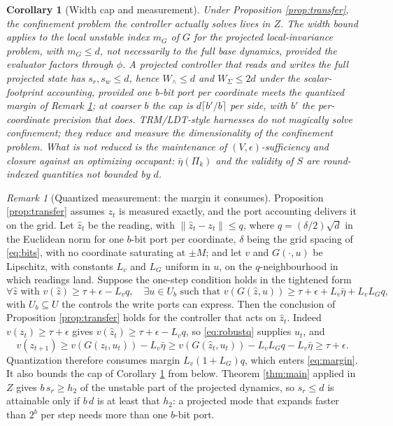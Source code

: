 \documentclass[11pt]{article}
\newtheorem{corollary}{Corollary}[section]
\theoremstyle{definition}
\theoremstyle{remark}
\newtheorem{remark}{Remark}[section]
\newcommand{\htwo}{h_2}
\newcommand{\W}{W}
\newcommand{\sr}{s_r}
\newcommand{\sw}{s_w}
\newcommand{\etabar}{\bar{\eta}}
\begin{document}
\begin{corollary}[Width cap and measurement]\label{cor:cap}
Under Proposition \ref{prop:transfer}, the confinement problem the controller actually solves lives in $Z$. The width bound applies to the local unstable index $m_G$ of $G$ for the projected local-invariance problem, with $m_G\le d$, not necessarily to the full base dynamics, provided the evaluator factors through $\phi$. A projected controller that reads and writes the full projected state has $\sr,\sw\le d$, hence $\W_\wedge\le d$ and $\W_\Sigma\le 2d$ under the scalar-footprint accounting, provided one $b$-bit port per coordinate meets the quantized margin of Remark \ref{rem:quant}; at coarser $b$ the cap is $d\lceil b'/b\rceil$ per side, with $b'$ the per-coordinate precision that does. TRM/LDT-style harnesses do not magically solve confinement; they reduce and measure the dimensionality of the confinement problem. What is not reduced is the maintenance of $(V,\epsilon)$-sufficiency and closure against an optimizing occupant: $\etabar(\Pi_k)$ and the validity of $S$ are round-indexed quantities not bounded by $d$.
\end{corollary}

\begin{remark}[Quantized measurement: the margin it consumes]\label{rem:quant}
Proposition \ref{prop:transfer} assumes $z_t$ is measured exactly, and the port accounting delivers it on the grid. Let $\hat z_t$ be the reading, with $\|\hat z_t-z_t\|\le q$, where $q=(\delta/2)\sqrt d$ in the Euclidean norm for one $b$-bit port per coordinate, $\delta$ being the grid spacing of \eqref{eq:bits}, with no coordinate saturating at $\pm M$; and let $v$ and $G(\cdot,u)$ be Lipschitz, with constants $L_v$ and $L_G$ uniform in $u$, on the $q$-neighbourhood in which readings land. Suppose the one-step condition holds in the tightened form
\begin{equation}
\forall\hat z\text{ with }v(\hat z)\ge\tau+\epsilon-L_vq,\quad\exists u\in U_b\text{ such that }v(G(\hat z,u))\ge\tau+\epsilon+L_v\etabar+L_vL_Gq, \tag{18$'$}\label{eq:robustq}
\end{equation}
with $U_b\subseteq U$ the controls the write ports can express. Then the conclusion of Proposition \ref{prop:transfer} holds for the controller that acts on $\hat z_t$. Indeed $v(z_t)\ge\tau+\epsilon$ gives $v(\hat z_t)\ge\tau+\epsilon-L_vq$, so \eqref{eq:robustq} supplies $u_t$, and
\begin{equation*}
v(z_{t+1})\ge v(G(z_t,u_t))-L_v\etabar\ge v(G(\hat z_t,u_t))-L_vL_Gq-L_v\etabar\ge\tau+\epsilon.
\end{equation*}
Quantization therefore consumes margin $L_v(1+L_G)q$, which enters \eqref{eq:margin}. It also bounds the cap of Corollary \ref{cor:cap} from below. Theorem \ref{thm:main} applied in $Z$ gives $b\,\sr\ge\htwo$ of the unstable part of the projected dynamics, so $\sr\le d$ is attainable only if $b\,d$ is at least that $\htwo$: a projected mode that expands faster than $2^b$ per step needs more than one $b$-bit port.
\end{remark}
\end{document}
